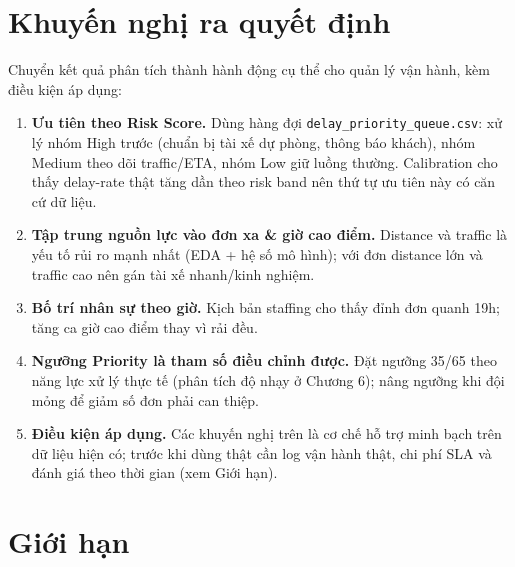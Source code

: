 \documentclass[12pt,a4paper,oneside]{report}
\newcommand{\code}[1]{\nolinkurl{#1}}
\begin{document}
\section{Khuyến nghị ra quyết định}

Chuyển kết quả phân tích thành hành động cụ thể cho quản lý vận hành, kèm điều
kiện áp dụng:

\begin{enumerate}[leftmargin=*]
  \item \textbf{Ưu tiên theo Risk Score.} Dùng hàng đợi
        \code{delay\_priority\_queue.csv}: xử lý nhóm High trước (chuẩn bị tài
        xế dự phòng, thông báo khách), nhóm Medium theo dõi traffic/ETA, nhóm
        Low giữ luồng thường. Calibration cho thấy delay-rate thật tăng dần theo
        risk band nên thứ tự ưu tiên này có căn cứ dữ liệu.
  \item \textbf{Tập trung nguồn lực vào đơn xa \& giờ cao điểm.} Distance và
        traffic là yếu tố rủi ro mạnh nhất (EDA + hệ số mô hình); với đơn
        distance lớn và traffic cao nên gán tài xế nhanh/kinh nghiệm.
  \item \textbf{Bố trí nhân sự theo giờ.} Kịch bản staffing cho thấy đỉnh đơn
        quanh 19h; tăng ca giờ cao điểm thay vì rải đều.
  \item \textbf{Ngưỡng Priority là tham số điều chỉnh được.} Đặt ngưỡng 35/65
        theo năng lực xử lý thực tế (phân tích độ nhạy ở Chương 6); nâng ngưỡng
        khi đội mỏng để giảm số đơn phải can thiệp.
  \item \textbf{Điều kiện áp dụng.} Các khuyến nghị trên là cơ chế hỗ trợ minh
        bạch trên dữ liệu hiện có; trước khi dùng thật cần log vận hành thật,
        chi phí SLA và đánh giá theo thời gian (xem Giới hạn).
\end{enumerate}

\section{Giới hạn}
\end{document}
